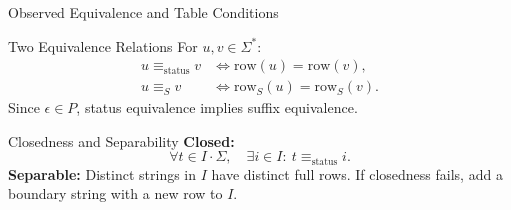 \documentclass{beamer}
\begin{document}
\begin{frame}{Observed Equivalence and Table Conditions}
    \begin{block}{Two Equivalence Relations}
        For $u,v\in\Sigma^*$:
        $$
        \begin{aligned}
            u\equiv_{\mathrm{status}}v
                &\Longleftrightarrow \text{row}(u)=\text{row}(v),\\
            u\equiv_S v
                &\Longleftrightarrow \text{row}_S(u)=\text{row}_S(v).
        \end{aligned}
        $$
        Since $\epsilon\in P$, status equivalence implies suffix equivalence.
    \end{block}
    \begin{block}{Closedness and Separability}
        \textbf{Closed:}
        $$
        \forall t\in I\cdot\Sigma,\quad
        \exists i\in I:\ t\equiv_{\mathrm{status}}i.
        $$
        \textbf{Separable:} Distinct strings in $I$ have distinct full rows.
        If closedness fails, add a boundary string with a new row to $I$.
    \end{block}
\end{frame}
\end{document}
